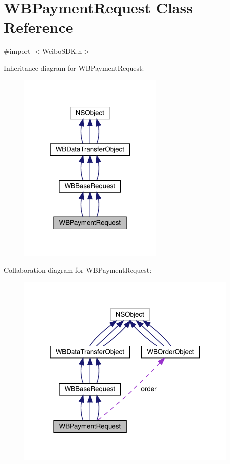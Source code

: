 \hypertarget{interface_w_b_payment_request}{}\section{W\+B\+Payment\+Request Class Reference}
\label{interface_w_b_payment_request}


{\ttfamily \#import $<$Weibo\+S\+D\+K.\+h$>$}



Inheritance diagram for W\+B\+Payment\+Request\+:\nopagebreak
\begin{figure}[H]
\begin{center}
\leavevmode
\includegraphics[width=199pt]{interface_w_b_payment_request__inherit__graph}
\end{center}
\end{figure}


Collaboration diagram for W\+B\+Payment\+Request\+:\nopagebreak
\begin{figure}[H]
\begin{center}
\leavevmode
\includegraphics[width=304pt]{interface_w_b_payment_request__coll__graph}
\end{center}
\end{figure}
